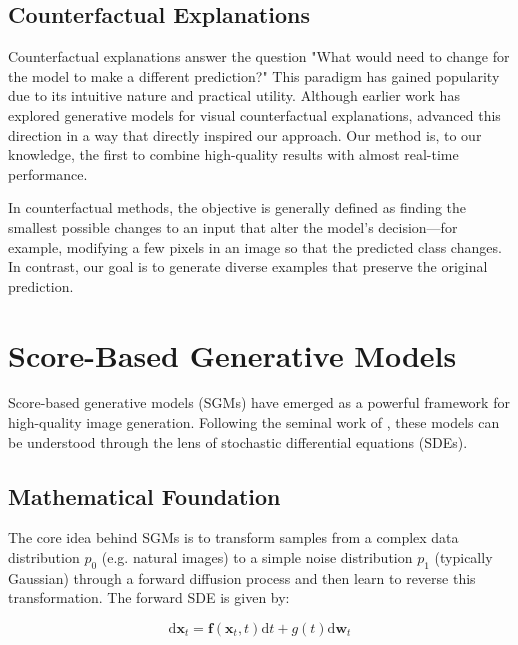 \documentclass[licencjacka,en]{pracamgr}
\newcommand{\diff}{\mathrm{d}}
\begin{document}
\subsection{Counterfactual Explanations}

Counterfactual explanations answer the question "What would need to change for the model to make a different prediction?" This paradigm has gained popularity due to its intuitive nature and practical utility. Although earlier work has explored generative models for visual counterfactual explanations, \cite{sobieski2024rethinkingvisualcounterfactualexplanations} advanced this direction in a way that directly inspired our approach. Our method is, to our knowledge, the first to combine high-quality results with almost real-time performance.

In counterfactual methods, the objective is generally defined as finding the smallest possible changes to an input that alter the model’s decision—for example, modifying a few pixels in an image so that the predicted class changes. In contrast, our goal is to generate diverse examples that preserve the original prediction.

\section{Score-Based Generative Models}\label{sec:sgm_background}

Score-based generative models (SGMs) have emerged as a powerful framework for high-quality image generation. Following the seminal work of \cite{song2021scorebasedgenerativemodelingstochastic}, these models can be understood through the lens of stochastic differential equations (SDEs).

\subsection{Mathematical Foundation}

The core idea behind SGMs is to transform samples from a complex data distribution $p_0$ (e.g. natural images) to a simple noise distribution $p_1$ (typically Gaussian) through a forward diffusion process and then learn to reverse this transformation. The forward SDE is given by:

\begin{equation}
\diff \mathbf{x}_t = \mathbf{f}(\mathbf{x}_t, t) \diff t + g(t) \diff \mathbf{w}_t
\label{eq:forward_sde}
\end{equation}
\end{document}
